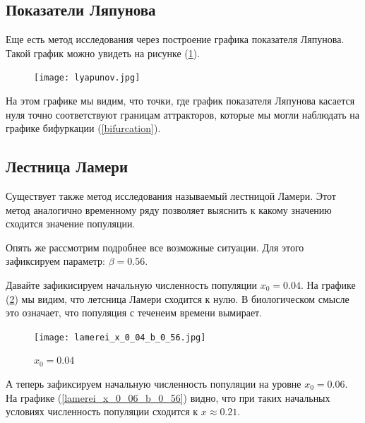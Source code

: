     \subsection{Показатели Ляпунова}    

        Еще есть метод исследования через построение графика показателя Ляпунова. Такой график можно увидеть на рисунке (\ref{lyapunov}).

        \begin{figure}
            \centering
            \texttt{[image: lyapunov.jpg]}

            \captionsetup{justification=centering}
            \caption{}
            \label{lyapunov}
        \end{figure}

        На этом графике мы видим, что точки, где график показателя Ляпунова касается нуля точно соответствуют границам аттракторов, которые мы могли наблюдать на графике бифуркации (\ref{bifurcation}).

    \subsection{Лестница Ламери}

        Существует также метод исследования называемый лестницой Ламери. Этот метод аналогично временному ряду позволяет выяснить к какому значению сходится значение популяции.
        
        Опять же рассмотрим подробнее все возможные ситуации. Для этого зафиксируем параметр: \(\beta = 0.56\). 

        Давайте зафикисируем начальную численность популяции \(x_0 = 0.04\). На графике (\ref{lamerei_x_0_04_b_0_56}) мы видим, что летсница Ламери сходится к нулю. В биологическом смысле это означает, что популяция с теченеим времени вымирает.

        \begin{figure}
            \centering
            \texttt{[image: lamerei\_x\_0\_04\_b\_0\_56.jpg]}

            \captionsetup{justification=centering}
            \caption{\(x_0 = 0.04\)}
            \label{lamerei_x_0_04_b_0_56}
        \end{figure}

        А теперь зафиксируем начальную численность популяции на уровне \(x_0 = 0.06\). На графике (\ref{lamerei_x_0_06_b_0_56}) видно, что при таких начальных условиях численность популяции сходится к \(x \approx 0.21\).
        
